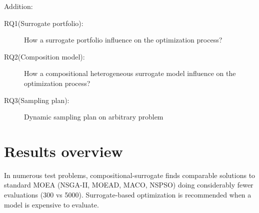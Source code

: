 Addition:

\begin{description}
    \item[RQ1(Surrogate portfolio):] How a surrogate portfolio influence on the optimization process?
    \item[RQ2(Composition model):] How a compositional heterogeneous surrogate model influence on the optimization process?
    \item[RQ3(Sampling plan):] Dynamic sampling plan on arbitrary problem
\end{description}

\section{Results overview}
In numerous test problems, compositional-surrogate finds comparable solutions to standard MOEA (NSGA-II, MOEAD, MACO, NSPSO) doing considerably fewer evaluations (300 vs 5000). 
Surrogate-based optimization is recommended when a model is expensive to evaluate.


